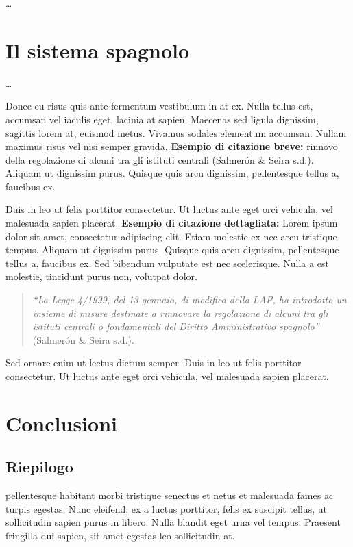 \documentclass[12pt,it,a4paper,]{report}
\begin{document}
\ldots{}

\hypertarget{il-sistema-spagnolo}{%
\chapter{Il sistema spagnolo}\label{il-sistema-spagnolo}}

\ldots{}

\newpage

Donec eu risus quis ante fermentum vestibulum in at ex. Nulla tellus
est, accumsan vel iaculis eget, lacinia at sapien. Maecenas sed ligula
dignissim, sagittis lorem at, euismod metus. Vivamus sodales elementum
accumsan. Nullam maximus risus vel nisi semper gravida. \textbf{Esempio
di citazione breve:} rinnovo della regolazione di alcuni tra gli
istituti centrali (Salmerón \& Seira s.d.). Aliquam ut dignissim purus.
Quisque quis arcu dignissim, pellentesque tellus a, faucibus ex.

Duis in leo ut felis porttitor consectetur. Ut luctus ante eget orci
vehicula, vel malesuada sapien placerat. \textbf{Esempio di citazione
dettagliata:} Lorem ipsum dolor sit amet, consectetur adipiscing elit.
Etiam molestie ex nec arcu tristique tempus. Aliquam ut dignissim purus.
Quisque quis arcu dignissim, pellentesque tellus a, faucibus ex. Sed
bibendum vulputate est nec scelerisque. Nulla a est molestie, tincidunt
purus non, volutpat dolor.

\begin{quote}
\emph{``La Legge 4/1999, del 13 gennaio, di modifica della LAP, ha
introdotto un insieme di misure destinate a rinnovare la regolazione di
alcuni tra gli istituti centrali o fondamentali del Diritto
Amministrativo spagnolo''} (Salmerón \& Seira s.d.).
\end{quote}

Sed ornare enim ut lectus dictum semper. Duis in leo ut felis porttitor
consectetur. Ut luctus ante eget orci vehicula, vel malesuada sapien
placerat.

\hypertarget{conclusioni}{%
\chapter{Conclusioni}\label{conclusioni}}

\hypertarget{riepilogo}{%
\section{Riepilogo}\label{riepilogo}}

pellentesque habitant morbi tristique senectus et netus et malesuada
fames ac turpis egestas. Nunc eleifend, ex a luctus porttitor, felis ex
suscipit tellus, ut sollicitudin sapien purus in libero. Nulla blandit
eget urna vel tempus. Praesent fringilla dui sapien, sit amet egestas
leo sollicitudin at.
\end{document}
